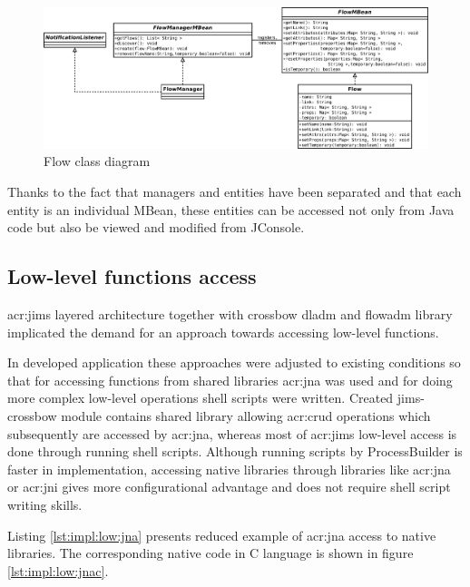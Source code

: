 \documentclass[11pt,openany]{book}
\begin{document}
        \begin{figure}[H]
          \centering
          \includegraphics[width=.85\textheight, angle=90]{img/impl/flow.pdf}

          \caption{Flow class diagram}
          \label{fig:impl:flow}
        \end{figure}

        Thanks to the fact that managers and entities have been separated and that each entity is an individual MBean,
        these entities can be accessed not only from Java code but also be viewed and modified from JConsole.


      \subsection{Low-level functions access}
      \label{sec:impl:low}

        \gls{acr:jims} layered architecture together with crossbow dladm and flowadm library implicated the demand for 
        an approach towards accessing low-level functions.

        In developed application these approaches were adjusted to existing conditions so that for accessing functions
        from shared libraries \gls{acr:jna} was used and for doing more complex low-level operations shell scripts were
        written. Created jims-crossbow module contains shared library allowing \gls{acr:crud} operations which
        subsequently are accessed by \gls{acr:jna}, whereas most of \gls{acr:jims} low-level access is done through
        running shell scripts. Although running scripts by ProcessBuilder is faster in implementation, accessing native
        libraries through libraries like \gls{acr:jna} or \gls{acr:jni} gives more configurational advantage and does
        not require shell script writing skills.

        Listing \ref{lst:impl:low:jna} presents reduced example of \gls{acr:jna} access to native libraries. The
        corresponding native code in C language is shown in figure \ref{lst:impl:low:jnac}. \\
\end{document}
